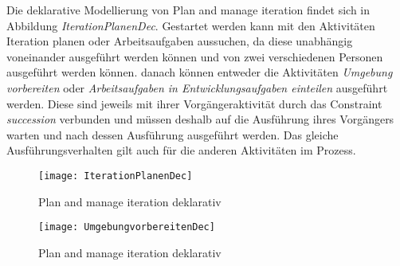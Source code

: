 Die deklarative Modellierung von Plan and manage iteration findet sich in Abbildung \textit{IterationPlanenDec}. Gestartet werden kann mit den Aktivitäten {Iteration planen} oder {Arbeitsaufgaben aussuchen}, da diese unabhängig voneinander ausgeführt werden können und von zwei verschiedenen Personen ausgeführt werden können.\newline
danach können entweder die Aktivitäten \textit{Umgebung vorbereiten} oder \textit{Arbeitsaufgaben in Entwicklungsaufgaben einteilen} ausgeführt werden. Diese sind jeweils mit ihrer Vorgängeraktivität durch das Constraint \textit{succession} verbunden und müssen deshalb auf die Ausführung ihres Vorgängers warten und nach dessen Ausführung ausgeführt werden.\newline
Das gleiche Ausführungsverhalten gilt auch für die anderen Aktivitäten im Prozess. 



\begin{figure}[htp]
\begin{center}
  \texttt{[image: IterationPlanenDec]} %
  \caption{Plan and manage iteration deklarativ}
  \label{fig:IterationPlanenDec}
\end{center}
\end{figure}

\begin{figure}[htp]
\begin{center}
  \texttt{[image: UmgebungvorbereitenDec]} %
  \caption{Plan and manage iteration deklarativ}
  \label{fig:UmgebungVorbereitenDec}
\end{center}
\end{figure}


